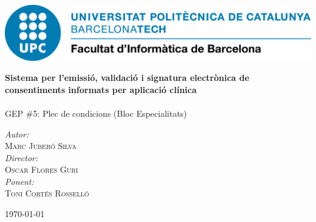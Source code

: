 \begin{titlepage}
\center

\includegraphics[scale=0.4]{img/UPC-FIB.png}
\vspace{2cm}


{\huge \bfseries Sistema per l'emissió, validació i signatura electrònica de consentiments informats per aplicació clínica}\\[0.4cm]
\HRule \\[0.2cm]


\Large GEP \#5: Plec de condicions (Bloc Especialitats)

\vspace{8cm}

\emph{Autor:}\\ \large
 \textsc{Marc Juberó Silva}\\
\vspace{0.5cm}
\emph{Director:}\\ \large
 \textsc{Oscar Flores Guri}\\
\vspace{0.5cm}
\emph{Ponent:}\\ \large
 \textsc{Toni Cortés Rosselló}\\

\vspace{1cm}


{\large \today}\\[1cm] %

\vfill
\end{titlepage}